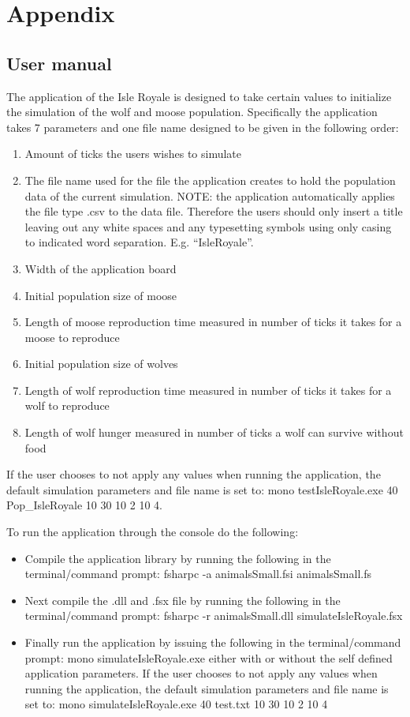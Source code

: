 \documentclass[a4paper]{report}
\begin{document}
\newpage
\section{Appendix}

\subsection{User manual}
The application of the Isle Royale is designed to take certain values to initialize the simulation of the wolf and moose population. Specifically the application takes 7 parameters and one file name designed to be given in the following order:
\begin{enumerate}
\item Amount of ticks the users wishes to simulate
\item The file name used for the file the application creates to hold the population data of the current simulation. NOTE: the application automatically applies the file type .csv to the data file. Therefore the users should only insert a title leaving out any white spaces and any typesetting symbols using only casing to indicated word separation. E.g. “IsleRoyale”.
\item Width of the application board
\item Initial population size of moose
\item Length of moose reproduction time measured in number of ticks it takes for a moose to reproduce
\item Initial population size of wolves
\item Length of wolf reproduction time measured in number of ticks it takes for a wolf to reproduce
\item Length of wolf hunger measured in number of ticks a wolf can survive without food
\end{enumerate}

If the user chooses to not apply any values when running the application, the default simulation parameters and file name is set to: mono testIsleRoyale.exe 40 Pop\_IsleRoyale 10 30 10 2 10 4.

To run the application through the console do the following:

\begin{itemize}
\item  Compile the application library by running the following in the terminal/command prompt: fsharpc -a animalsSmall.fsi animalsSmall.fs
\item Next compile the .dll and .fsx file by running the following in the terminal/command prompt: fsharpc -r animalsSmall.dll simulateIsleRoyale.fsx
\item Finally run the application by issuing the following in the terminal/command prompt: mono simulateIsleRoyale.exe either with or without the self defined application parameters. If the user chooses to not apply any values when running the application, the default simulation parameters and file name is set to: mono simulateIsleRoyale.exe 40 test.txt 10 30 10 2 10 4
\end{itemize}
\end{document}
